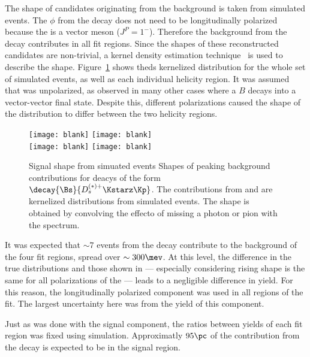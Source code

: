 The shape of \Bp candidates originating from the \btodsstrphi background is taken from simulated
events.
The $\phi$ from the decay \btodsstrphi does not need to be longitudinally polarized because the
\Dssp is a vector meson ($J^P=1^-$).
Therefore the background from the decay \btodsstrphi contributes in all fit regions.
Since the shapes of these reconstructed candidates are non-trivial, a kernel density estimation
technique~\cite{Cranmer:2000du} is used to describe the shape.
Figure~\ref{fig:dsphi:sigshape} shows theds kernelized distribution for the whole set of simulated
events, as well as each individual helicity region.
It was assumed that \Dssp was unpolarized, as observed in many other cases where a
$B$ decays into a vector-vector final state.
Despite this, different \phii polarizations caused the shape of the distribution to differ
between the two helicity regions.

\begin{figure}
  \begin{center}
    \texttt{[image: blank]}
    \texttt{[image: blank]}\\
    \texttt{[image: blank]}
    \texttt{[image: blank]}
    \caption{\small
      Signal shape from simuated events
      Shapes of peaking background contributions for
      deacys of the form $\decay{\Bs}{D_s^{(*)+}\Kstarz\Kp}$.
      The contributions from \btodsstrphi and \bstodskstrk are kernelized distributions from
      simulated events.
      The \bstodsstrkstrk shape is obtained by convolving the
      effecto of missing a photon or pion with the \bstodskstrk spectrum.
    }
    \label{fig:dsphi:sigshape}
  \end{center}
\end{figure}

It was expected that $\sim7$ events from the decay \btodsstrphi contribute to the background of the
four fit regions, spread over $\sim300\mev$.
At this level, the difference in the true distributions and those shown in 
--- especially considering rising shape is the same for all polarizations of the \phii ---
leads to a negligible difference in yield.
For this reason, the longitudinally polarized \btodsstrphi component was used in all regions of the
fit.
The largest uncertainty here was from the yield of this component.

Just as was done with the signal component, the ratios between yields of each fit region was fixed
using simulation.
Approximatly $95\pc$ of the contribution from the decay \btodsstrphi is expected to be in the
signal region.



